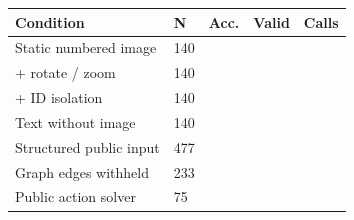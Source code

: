 \begin{tabularx}{\linewidth}{Xlrrr}
\toprule
Condition & N & Acc. & Valid & Calls\\\midrule
Static numbered image & 140 &  &  & \\
+ rotate / zoom & 140 &  &  & \\
+ ID isolation & 140 &  &  & \\
Text without image & 140 &  &  & \\
Structured public input & 477 &  &  & \\
Graph edges withheld & 233 &  &  & \\
Public action solver & 75 &  &  & \\
\bottomrule
\end{tabularx}
